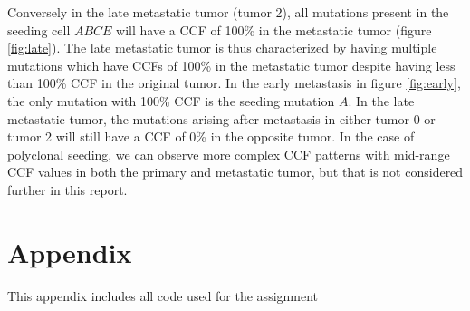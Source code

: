 \documentclass{article}
\begin{document}
Conversely in the late metastatic tumor (tumor 2), all mutations present in the seeding cell $ABCE$ will have a CCF of 100\% in the metastatic tumor (figure \ref{fig:late}). The late metastatic tumor is thus characterized by having multiple mutations which have CCFs of 100\% in the metastatic tumor despite having less than 100\% CCF in the original tumor. In the early metastasis in figure \ref{fig:early}, the only mutation with 100\% CCF is the seeding mutation $A$. In the late metastatic tumor, the mutations arising after metastasis in either tumor 0 or tumor 2 will still have a CCF of 0\% in the opposite tumor. In the case of polyclonal seeding, we can observe more complex CCF patterns with mid-range CCF values in both the primary and metastatic tumor, but that is not considered further in this report.

\newpage

\section*{Appendix}

This appendix includes all code used for the assignment\\
~\\



~\\



~\\



~\\



~\\


\end{document}
